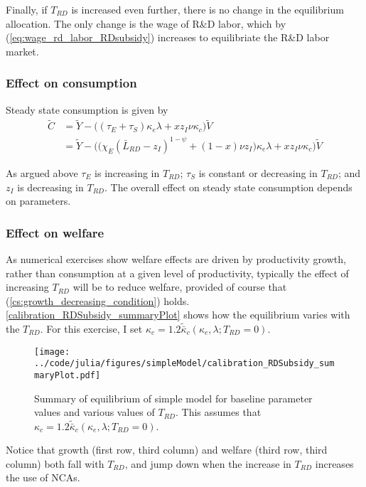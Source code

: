 \documentclass[11pt,english]{article}
\theoremstyle{remark}
\begin{document}
Finally, if $T_{RD}$ is increased even further, there is no change in the equilibrium allocation. The only change is the wage of R\&D labor, which by (\ref{eq:wage_rd_labor_RDsubsidy}) increases to equilibriate the R\&D labor market.

\subsubsection{Effect on consumption}

Steady state consumption is given by
\begin{align}
\tilde{C} &= \tilde{Y} - \Big( (\tau_E  + \tau_S)\kappa_e \lambda + x z_I \nu \kappa_c \Big) \tilde{V} \\
&= \tilde{Y} - \Big( \big( \chi_E (\bar{L}_{RD} - z_I)^{1-\psi} + (1-x) \nu z_I \big) \kappa_e \lambda + x z_I \nu \kappa_c \Big) \tilde{V}  \label{cs:scen2:consumption_eq}
\end{align}

As argued above $\tau_E$ is increasing in $T_{RD}$; $\tau_S$ is constant or decreasing in $T_{RD}$; and $z_I$ is decreasing in $T_{RD}$. The overall effect on steady state consumption depends on parameters. 

\subsubsection{Effect on welfare}

As numerical exercises show welfare effects are driven by productivity growth, rather than consumption at a given level of productivity, typically the effect of increasing $T_{RD}$ will be to reduce welfare, provided of course that (\ref{cs:growth_decreasing_condition}) holds. \autoref{calibration_RDSubsidy_summaryPlot} shows how the equilibrium varies with the $T_{RD}$. For this exercise, I set $\kappa_c = 1.2 \tilde{\bar{\kappa}}_c(\kappa_e,\lambda;T_{RD} = 0)$. 

\begin{figure}[]
	\texttt{[image: ../code/julia/figures/simpleModel/calibration\_RDSubsidy\_summaryPlot.pdf]}
	\caption{Summary of equilibrium of simple model for baseline parameter values and various values of $T_{RD}$. This assumes that $\kappa_c = 1.2 \tilde{\bar{\kappa}}_c(\kappa_e,\lambda;T_{RD} = 0)$.}
	\label{calibration_RDSubsidy_summaryPlot}
\end{figure}

Notice that growth (first row, third column) and welfare (third row, third column) both fall with $T_{RD}$, and jump down when the increase in $T_{RD}$ increases the use of NCAs.
\end{document}
